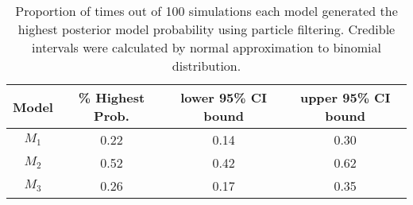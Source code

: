 \documentclass{article}
\begin{document}
\begin{table}
\begin{center}
\caption{Proportion of times out of 100 simulations each model generated the highest posterior model probability using particle filtering. Credible intervals were calculated by normal approximation to binomial distribution.} \label{tab:pf.propbestmod}
\begin{tabular}{|c|c|c|c|}
\hline
 Model & \% Highest Prob. & lower 95\% CI bound & upper 95\% CI bound \\
 \hline
 $M_1$ & 0.22 & 0.14 & 0.30 \\
 $M_2$ & 0.52 & 0.42 & 0.62 \\
 $M_3$ & 0.26 & 0.17 & 0.35 \\
 \hline
\end{tabular}
\end{center}
\end{table}

\clearpage



\end{document}
